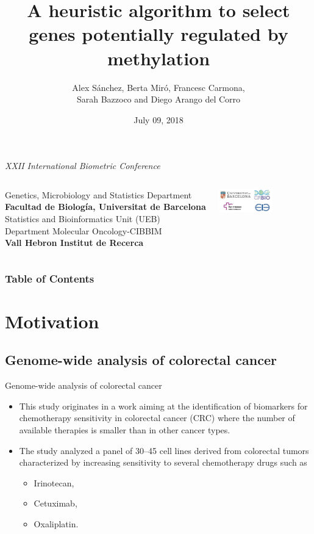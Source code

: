 \documentclass[handout]{beamer}
\title[L-Shape Selection]{A heuristic algorithm to select genes potentially regulated by methylation}
\author[Álex Sánchez]{Alex Sánchez, Berta Mir\'o, Francesc Carmona, \\
	Sarah Bazzoco and Diego Arango del Corro}
\date[]{July 09, 2018}
\begin{document}
\begin{frame}
	
\begin{scriptsize}
\begin{center}
  \emph{ XXII International Biometric Conference}
\end{center}
\end{scriptsize}

\titlepage

\begin{columns}
   \scriptsize
   Genetics, Microbiology and Statistics Department \\ 
   \textbf{Facultad de Biología, Universitat de Barcelona}\\
   Statistics and Bioinformatics Unit (UEB)\\
   Department Molecular Oncology-CIBBIM \\ 
   \textbf{Vall Hebron Institut de Recerca}

  \hfill{}
  \includegraphics[height=1cm]{images/alllogos.png}
\end{columns}

\end{frame}


\begin{frame}
\frametitle{Table of Contents}
\tableofcontents
\end{frame}

\section{Motivation}

\subsection{Genome-wide analysis of colorectal cancer}

\begin{frame}{Genome-wide analysis of colorectal cancer}
  \begin{itemize}
  \item This study originates in a work aiming at the identification of biomarkers for chemotherapy sensitivity in colorectal cancer (CRC) where the number of available therapies is smaller than in other cancer types.
  \item The study analyzed a panel of 30--45 cell lines derived from colorectal tumors characterized by increasing sensitivity to several chemotherapy drugs such as \begin{itemize}
                \item Irinotecan,
                \item Cetuximab,
                \item Oxaliplatin.
              \end{itemize}
  \end{itemize}
\end{frame}
\end{document}
